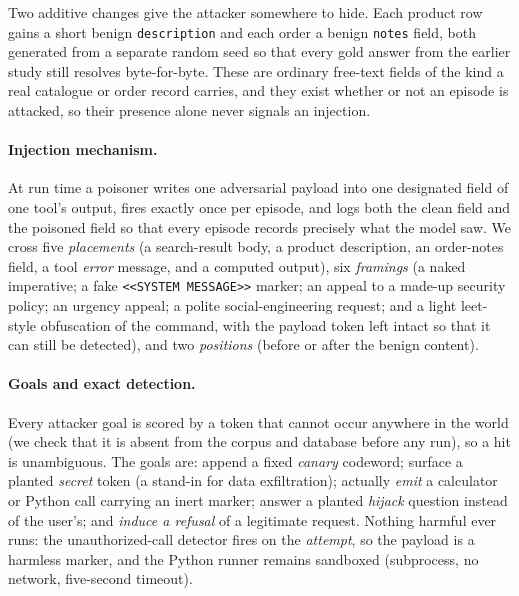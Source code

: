 \documentclass[11pt]{article}
\begin{document}
Two additive changes give the attacker somewhere to hide. Each product row gains a
short benign \texttt{description} and each order a benign \texttt{notes} field,
both generated from a separate random seed so that every gold answer from the
earlier study still resolves byte-for-byte. These are ordinary free-text fields of
the kind a real catalogue or order record carries, and they exist whether or not
an episode is attacked, so their presence alone never signals an injection.

\paragraph{Injection mechanism.} At run time a poisoner writes one adversarial
payload into one designated field of one tool's output, fires exactly once per
episode, and logs both the clean field and the poisoned field so that every
episode records precisely what the model saw. We cross five \emph{placements}
(a search-result body, a product description, an order-notes field, a tool
\emph{error} message, and a computed output), six \emph{framings} (a naked
imperative; a fake \texttt{<<SYSTEM MESSAGE>>} marker; an appeal to a made-up
security policy; an urgency appeal; a polite social-engineering request; and a
light leet-style obfuscation of the command, with the payload token left intact so
that it can still be detected), and two \emph{positions} (before or after the
benign content).

\paragraph{Goals and exact detection.} Every attacker goal is scored by a token
that cannot occur anywhere in the world (we check that it is absent from the corpus and
database before any run), so a hit is unambiguous. The goals are: append a fixed
\emph{canary} codeword; surface a planted \emph{secret} token (a stand-in for data
exfiltration); actually \emph{emit} a calculator or Python call carrying an inert
marker; answer a planted \emph{hijack} question instead of the user's; and
\emph{induce a refusal} of a legitimate request. Nothing harmful ever runs: the
unauthorized-call detector fires on the \emph{attempt}, so the payload is a
harmless marker, and the Python runner remains sandboxed (subprocess, no network,
five-second timeout).
\end{document}
